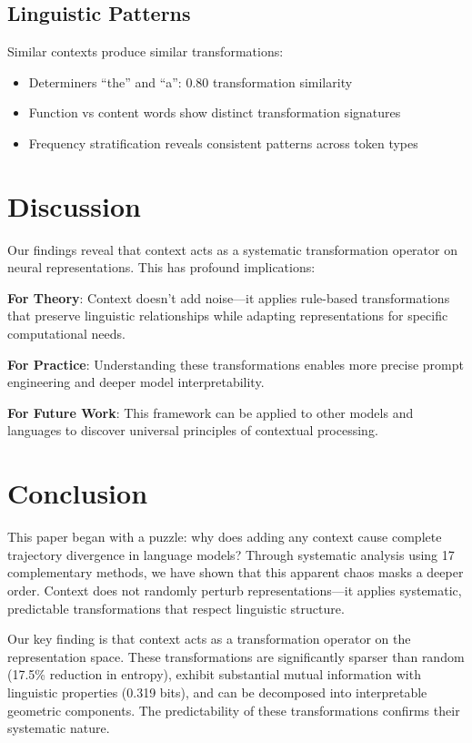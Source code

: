 \documentclass[11pt]{article}
\begin{document}
\subsection{Linguistic Patterns}

Similar contexts produce similar transformations:
\begin{itemize}
\item Determiners ``the'' and ``a'': 0.80 transformation similarity
\item Function vs content words show distinct transformation signatures
\item Frequency stratification reveals consistent patterns across token types
\end{itemize}

\section{Discussion}

Our findings reveal that context acts as a systematic transformation operator on neural representations. This has profound implications:

\textbf{For Theory}: Context doesn't add noise---it applies rule-based transformations that preserve linguistic relationships while adapting representations for specific computational needs.

\textbf{For Practice}: Understanding these transformations enables more precise prompt engineering and deeper model interpretability.

\textbf{For Future Work}: This framework can be applied to other models and languages to discover universal principles of contextual processing.

\section{Conclusion}

This paper began with a puzzle: why does adding any context cause complete trajectory divergence in language models? Through systematic analysis using 17 complementary methods, we have shown that this apparent chaos masks a deeper order. Context does not randomly perturb representations---it applies systematic, predictable transformations that respect linguistic structure.

Our key finding is that context acts as a transformation operator on the representation space. These transformations are significantly sparser than random (17.5\% reduction in entropy), exhibit substantial mutual information with linguistic properties (0.319 bits), and can be decomposed into interpretable geometric components. The predictability of these transformations confirms their systematic nature.
\end{document}

